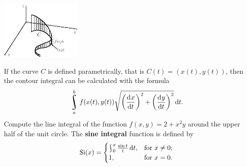 \begin{questions}
            \begin{center}
              \includegraphics[width=0.3\textwidth]{contourintegral}
            \end{center}
            If the curve $ C $ is defined parametrically, that is $ C(t) = (x(t), y(t)) $, then the contour integral can be
            calculated with the formula
            \begin{displaymath}
              \rint_a^b f(x(t), y(t)) \sqrt{\left(\dod{x}{t}\right)^2 + \left(\dod{y}{t}\right)^2} \dif{t}.
            \end{displaymath}
            Compute the line integral of the function $ f(x,y) = 2 + x^2 y $ around the upper half of the unit circle.
  \questioS The \textbf{sine integral} function is defined by
            \begin{displaymath}
              \mathrm{Si}(x) =
              \begin{cases}
                \rint^x_0 \frac{\sin t}{t} \dif{t}, &\text{for $ x \neq 0 $;}\\
                1, &\text{for $ x = 0 $.}
              \end{cases}
            \end{displaymath}
\end{questions}
